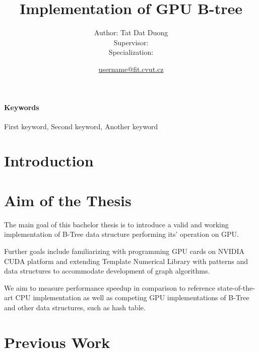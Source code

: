 \documentclass{article}
\title{Implementation of GPU B-tree} %
\author{
    \small Author: Tat Dat Duong\\
    \small Supervisor: \\
    \small Specialization:
} %
\date{\small \url{username@fit.cvut.cz}}
\begin{document}
\maketitle              

\paragraph{Keywords}{First keyword, Second keyword, Another keyword}

\section{Introduction}

\section{Aim of the Thesis}
The main goal of this bachelor thesis is to introduce a valid and working implementation of B-Tree data structure performing its' operation on GPU. 

Further goals include familiarizing with programming GPU cards on NVIDIA CUDA platform and extending Template Numerical Library with patterns and data structures to accommodate development of graph algorithms. 

We aim to measure performance speedup in comparison to reference state-of-the-art CPU implementation as well as competing GPU implementations of B-Tree and other data structures, such as hash table.

\section{Previous Work}
\end{document}

